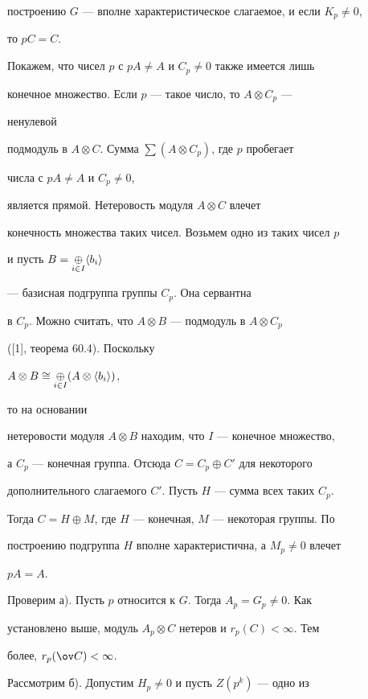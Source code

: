 \begin{pf}
построению $G$ --- вполне характеристическое слагаемое, и если $K_p\ne0$, 


то $p C=C$. 


 


Покажем, что чисел $p$ с $pA\ne A$ и $C_p\ne0$ также имеется лишь 


конечное множество. Если $p$ --- такое число, то $A\otimes C_p$ --- 


ненулевой 


подмодуль в $A\otimes C$. Сумма $\sum(A\otimes C_p)$, где $p$ пробегает 


числа с $pA\ne A$ и $C_p\ne0$, 


является прямой. Нетеровость модуля $A\otimes C$ влечет 


конечность множества таких чисел. Возьмем одно из таких чисел $p$ 


и пусть $B=\mathop{\oplus}\limits_{i\in I}\langle b_i\rangle$ 


--- базисная подгруппа группы $C_p$. Она сервантна 


в $C_p$. Можно считать, что $A\otimes B$ --- подмодуль в $A\otimes C_p$ 


([1], теорема 60.4). Поскольку 


$A\otimes B\cong\mathop{\oplus}\limits_{i\in I}(A\otimes\langle b_i\rangle)$, 


то на основании 


нетеровости модуля $A\otimes B$ находим, что $I$ --- конечное множество, 


а $C_p$ --- конечная группа. Отсюда $C=C_p\oplus C'$ для некоторого 


дополнительного слагаемого $C'$. Пусть $H$ --- сумма всех таких $C_p$. 


Тогда $C=H\oplus M$, где $H$ --- конечная, $M$ --- некоторая группы. По 


построению подгруппа $H$ вполне характеристична, а $M_p\ne0$ влечет 


$pA=A$. 


 


Проверим а). Пусть $p$ относится к $G$. Тогда $A_p=G_p\ne0$. Как 


установлено выше, модуль $A_p\otimes C$ нетеров и $r_p(C)<\infty$. Тем 


более, $r_p(\ov C)<\infty$. 


 


Рассмотрим б). Допустим $H_p\ne0$ и пусть $Z(p^k)$ --- одно из 



\end{pf}
